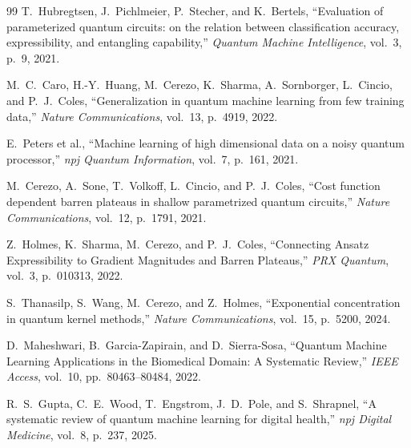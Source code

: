 \documentclass[11pt,a4paper]{article}
\begin{document}
\begin{thebibliography}{99}
T.~Hubregtsen, J.~Pichlmeier, P.~Stecher, and K.~Bertels,
``Evaluation of parameterized quantum circuits: on the relation between classification accuracy,
expressibility, and entangling capability,''
\textit{Quantum Machine Intelligence}, vol.~3, p.~9, 2021.

M.~C.~Caro, H.-Y.~Huang, M.~Cerezo, K.~Sharma, A.~Sornborger, L.~Cincio, and P.~J.~Coles,
``Generalization in quantum machine learning from few training data,''
\textit{Nature Communications}, vol.~13, p.~4919, 2022.

E.~Peters et al.,
``Machine learning of high dimensional data on a noisy quantum processor,''
\textit{npj Quantum Information}, vol.~7, p.~161, 2021.

M.~Cerezo, A.~Sone, T.~Volkoff, L.~Cincio, and P.~J.~Coles,
``Cost function dependent barren plateaus in shallow parametrized quantum circuits,''
\textit{Nature Communications}, vol.~12, p.~1791, 2021.

Z.~Holmes, K.~Sharma, M.~Cerezo, and P.~J.~Coles,
``Connecting Ansatz Expressibility to Gradient Magnitudes and Barren Plateaus,''
\textit{PRX Quantum}, vol.~3, p.~010313, 2022.

S.~Thanasilp, S.~Wang, M.~Cerezo, and Z.~Holmes,
``Exponential concentration in quantum kernel methods,''
\textit{Nature Communications}, vol.~15, p.~5200, 2024.

D.~Maheshwari, B.~Garcia-Zapirain, and D.~Sierra-Sosa,
``Quantum Machine Learning Applications in the Biomedical Domain: A Systematic Review,''
\textit{IEEE Access}, vol.~10, pp.~80463--80484, 2022.

R.~S.~Gupta, C.~E.~Wood, T.~Engstrom, J.~D.~Pole, and S.~Shrapnel,
``A systematic review of quantum machine learning for digital health,''
\textit{npj Digital Medicine}, vol.~8, p.~237, 2025.

\end{thebibliography}
\end{document}
